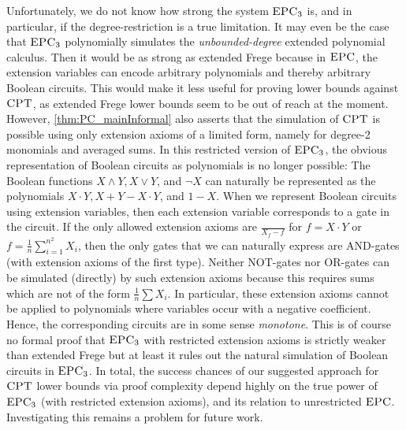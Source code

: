\documentclass[10pt,a4paper]{article}
\newcommand{\CPT}{\mbox{\sc CPT}}
\newcommand{\EPC}{\mbox{\sc EPC}}
\begin{document}
	Unfortunately, we do not know how strong the system $\EPC_3$ is, and in particular, if the degree-restriction is a true limitation. It may even be the case that $\EPC_3$ polynomially simulates the \emph{unbounded-degree} extended polynomial calculus. Then it would be as strong as extended Frege because in $\EPC$, the extension variables can encode arbitrary polynomials and thereby arbitrary Boolean circuits. This would make it less useful for proving lower bounds against $\CPT$, as extended Frege lower bounds seem to be out of reach at the moment.\\
	However, \autoref{thm:PC_mainInformal} also asserts that the simulation of $\CPT$ is possible using only extension axioms of a limited form, namely for degree-2 monomials and averaged sums. In this restricted version of $\EPC_3$, the obvious representation of Boolean circuits as polynomials is no longer possible: The Boolean functions $X \land Y, X \lor Y$, and $\neg X$ can naturally be represented as the polynomials $X \cdot Y, X + Y - X \cdot Y$, and $1-X$. When we represent Boolean circuits using extension variables, then each extension variable corresponds to a gate in the circuit. If the only allowed extension axioms are $\frac{}{X_f - f}$ for $f = X \cdot Y$ or $f = \frac{1}{n} \sum_{i=1}^{n^2} X_i$, then the only gates that we can naturally express are AND-gates (with extension axioms of the first type). Neither NOT-gates nor OR-gates can be simulated (directly) by such extension axioms because this requires sums which are not of the form $\frac{1}{n} \sum X_i$. In particular, these extension axioms cannot be applied to polynomials where variables occur with a negative coefficient. Hence, the corresponding circuits are in some sense \emph{monotone}. This is of course no formal proof that $\EPC_3$ with restricted extension axioms is strictly weaker than extended Frege but at least it rules out the natural simulation of Boolean circuits in $\EPC_3$. In total, the success chances of our suggested approach for $\CPT$ lower bounds via proof complexity depend highly on the true power of $\EPC_3$ (with restricted extension axioms), and its relation to unrestricted $\EPC$. Investigating this remains a problem for future work.\\
	
\end{document}
